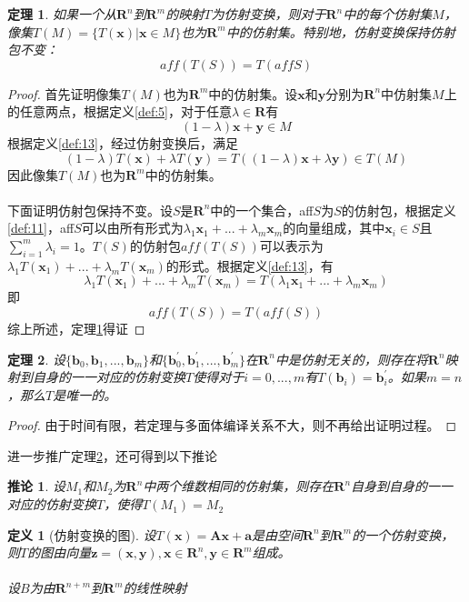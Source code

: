 \documentclass[a4paper,11pt,oneside]{article}
\newtheorem{definition}{定义}[section]
\newtheorem{theorem}{定理}[section]
\newtheorem{proof}{证明}[section]
\newtheorem{inference}{推论}[section]
\begin{document}
			\begin{theorem}
				\label{the:1.6}
				如果一个从$\textbf{R}^{n}$到$\textbf{R}^{m}$的映射$T$为仿射变换，则对于$\textbf{R}^{n}$中的每个仿射集$M$，像集$T(M)=\{T(\textbf{x})|\textbf{x}\in M\}$也为$\textbf{R}^{m}$中的仿射集。特别地，仿射变换保持仿射包不变：
				$$aff(T(S))=T(affS)$$
			\end{theorem}
			\begin{proof}
				首先证明像集$T(M)$也为$\textbf{R}^{m}$中的仿射集。设$\textbf{x}$和$\textbf{y}$分别为$\textbf{R}^{n}$中仿射集$M$上的任意两点，根据定义\ref{def:5}，对于任意$\lambda \in \textbf{R}$有
				$$(1-\lambda)\textbf{x}+\textbf{y}\in M$$
				根据定义\ref{def:13}，经过仿射变换后，满足
				$$(1-\lambda)T(\textbf{x})+\lambda T(\textbf{y})=T((1-\lambda)\textbf{x}+\lambda \textbf{y})\in T(M)$$
				因此像集$T(M)$也为$\textbf{R}^{m}$中的仿射集。\\
				\\
				下面证明仿射包保持不变。设$S$是$\textbf{R}^{n}$中的一个集合，aff$S$为$S$的仿射包，根据定义\ref{def:11}，aff$S$可以由所有形式为$\lambda_{1}\textbf{x}_{1}+...+\lambda_{m}\textbf{x}_{m}$的向量组成，其中$\textbf{x}_{i}\in S$且$\sum_{i=1}^{m}\lambda_{i}=1$。$T(S)$的仿射包$aff(T(S))$可以表示为$\lambda_{1}T(\textbf{x}_{1})+...+\lambda_{m}T(\textbf{x}_{m})$的形式。根据定义\ref{def:13}，有
				$$\lambda_{1}T(\textbf{x}_{1})+...+\lambda_{m}T(\textbf{x}_{m})=T(\lambda_{1}\textbf{x}_{1}+...+\lambda_{m}\textbf{x}_{m})$$
				即
				$$aff(T(S))=T(aff(S))$$
				综上所述，定理\ref{the:1.6}得证
			\end{proof}
			\begin{theorem}
				\label{the:1.7}
				设$\{\textbf{b}_{0},\textbf{b}_{1},...,\textbf{b}_{m}\}$和$\{\textbf{b}_{0}^{'},\textbf{b}_{1}^{'},...,\textbf{b}_{m}^{'}\}$在$\textbf{R}^{n}$中是仿射无关的，则存在将$\textbf{R}^{n}$映射到自身的一一对应的仿射变换$T$使得对于$i=0,...,m$有$T(\textbf{b}_{i})=\textbf{b}_{i}^{'}$。如果$m=n$，那么$T$是唯一的。
			\end{theorem}
			\begin{proof}
				由于时间有限，若定理与多面体编译关系不大，则不再给出证明过程。
			\end{proof}
			进一步推广定理\ref{the:1.7}，还可得到以下推论
			\begin{inference}
				设$M_{1}$和$M_{2}$为$\textbf{R}^{n}$中两个维数相同的仿射集，则存在$\textbf{R}^{n}$自身到自身的一一对应的仿射变换$T$，使得$T(M_{1})=M_{2}$
			\end{inference}
			\begin{definition}[仿射变换的图]
				设$T(\textbf{x})=\textbf{A}\textbf{x}+\textbf{a}$是由空间$\textbf{R}^{n}$到$\textbf{R}^{m}$的一个仿射变换，则$T$的图由向量$\textbf{z}=(\textbf{x},\textbf{y}), \textbf{x}\in \textbf{R}^{n}, \textbf{y}\in \textbf{R}^{m}$组成。\\
				\\
				设$B$为由$\textbf{R}^{n+m}$到$\textbf{R}^{m}$的线性映射$$
			\end{definition}
\end{document}
